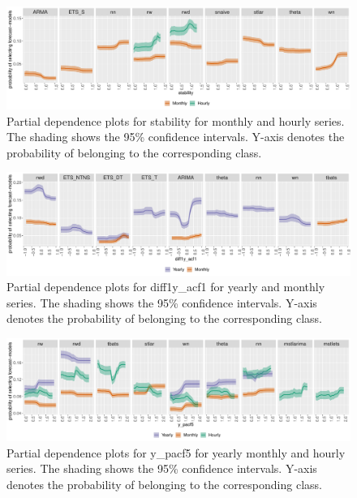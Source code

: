 \documentclass[11pt,a4paper,]{article}
\begin{document}
\begin{figure}[h]

{\centering \includegraphics[width=\textwidth]{figure/pdpmonthlyhourlyStability-1} 

}

\caption{Partial dependence plots for stability for monthly and hourly series. The shading shows the 95\% confidence intervals. Y-axis denotes the probability of belonging to the corresponding class.}\label{fig:pdpmonthlyhourlyStability}
\end{figure}

\begin{figure}[h]

{\centering \includegraphics[width=\textwidth]{figure/diff1yacf1-1} 

}

\caption{Partial dependence plots for diff1y\_acf1 for yearly and monthly series. The shading shows the 95\% confidence intervals. Y-axis denotes the probability of belonging to the corresponding class.}\label{fig:diff1yacf1}
\end{figure}

\begin{figure}[h]

{\centering \includegraphics[width=\textwidth]{figure/ypacf5-1} 

}

\caption{Partial dependence plots for y\_pacf5 for yearly monthly and hourly series. The shading shows the 95\% confidence intervals. Y-axis denotes the probability of belonging to the corresponding class. }\label{fig:ypacf5}
\end{figure}
\end{document}
